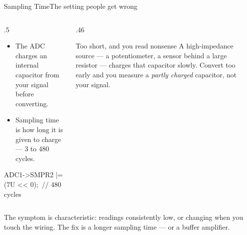 \documentclass[9pt,aspectratio=169,xcolor=table]{beamer}
\begin{document}
\begin{frame}{Sampling Time}{The setting people get wrong}
    \begin{columns}[T]
    \begin{column}{.5\textwidth}
        \begin{itemize}
            \item The ADC charges an internal capacitor from your signal
                  \alert{before} converting.
            \item \alert{Sampling time} is how long it is given to charge ---
                  3 to 480 cycles.
        \end{itemize}

        \vspace{2mm}
        {\ttfamily\scriptsize ADC1->SMPR2 |= (7U << 0);~// 480 cycles}
    \end{column}
    \begin{column}{.46\textwidth}
        \begin{block}{Too short, and you read nonsense}
            A \alert{high-impedance} source --- a potentiometer, a sensor behind a
            large resistor --- charges that capacitor slowly. Convert too early and
            you measure a \emph{partly charged} capacitor, not your signal.
        \end{block}
    \end{column}
    \end{columns}

    \vspace{3mm}
    {\small The symptom is characteristic: readings \alert{consistently low}, or
    changing when you touch the wiring. The fix is a longer sampling time --- or a
    buffer amplifier.}
\end{frame}
\end{document}
